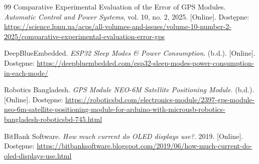 \documentclass[12pt, a4paper]{EE-dyplom}
\begin{document}
\begin{thebibliography}{99}
Comparative Experimental Evaluation of the Error of GPS Modules. \textit{Automatic Control and Power Systems}, vol. 10, no. 2, 2025. [Online]. Dostępne: \url{https://science.lpnu.ua/acps/all-volumes-and-issues/volume-10-number-2-2025/comparative-experimental-evaluation-error-gps}

DeepBlueEmbedded. \textit{ESP32 Sleep Modes \& Power Consumption}. (b.d.). [Online]. Dostępne: \url{https://deepbluembedded.com/esp32-sleep-modes-power-consumption-in-each-mode/}

Robotics Bangladesh. \textit{GPS Module NEO-6M Satellite Positioning Module}. (b.d.). [Online]. Dostępne: \url{https://roboticsbd.com/electronics-module/2397-gps-module-neo-6m-satellite-positioning-module-for-arduino-with-microusb-robotics-bangladesh-roboticsbd-745.html}

BitBank Software. \textit{How much current do OLED displays use?}. 2019. [Online]. Dostępne: \url{https://bitbanksoftware.blogspot.com/2019/06/how-much-current-do-oled-displays-use.html}

\end{thebibliography}
\end{document}
